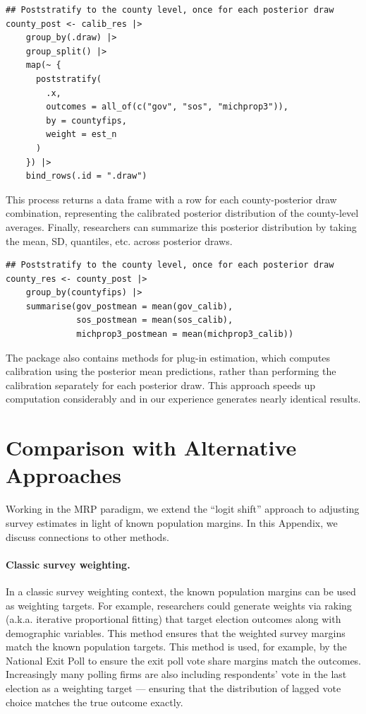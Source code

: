 \begin{small}
\begin{lstlisting}
## Poststratify to the county level, once for each posterior draw
county_post <- calib_res |> 
    group_by(.draw) |>
    group_split() |>
    map(~ {
      poststratify(
        .x, 
        outcomes = all_of(c("gov", "sos", "michprop3")),
        by = countyfips, 
        weight = est_n
      )
    }) |>
    bind_rows(.id = ".draw") 
\end{lstlisting}
\end{small}

This process returns a data frame with a row for each county-posterior draw combination, representing the calibrated posterior distribution of the county-level averages. Finally,  researchers can summarize this posterior distribution by taking the mean, SD, quantiles, etc. across posterior draws.

\begin{small}
\begin{lstlisting}
## Poststratify to the county level, once for each posterior draw
county_res <- county_post |> 
    group_by(countyfips) |>
    summarise(gov_postmean = mean(gov_calib),
              sos_postmean = mean(sos_calib),
              michprop3_postmean = mean(michprop3_calib))
\end{lstlisting}
\end{small}

The package also contains methods for plug-in estimation, which computes calibration using the posterior mean predictions, rather than performing the calibration separately for each posterior draw. This approach speeds up computation considerably and in our experience generates nearly identical results. 


\clearpage

\section{Comparison with Alternative Approaches}
\label{apx:otherwting}

Working in the MRP paradigm, we extend the ``logit shift'' approach to adjusting survey estimates in light of known population margins. 
In this Appendix, we discuss connections to other methods. 


\paragraph{Classic survey weighting.}
In a classic survey weighting context, the known population margins can be used as weighting targets. 
For example, researchers could generate weights via raking (a.k.a. iterative proportional fitting) that target election outcomes along with demographic variables.
This method ensures that the weighted survey margins match the known population targets. 
This method is used, for example, by the National Exit Poll to ensure the exit poll vote share margins match the outcomes. 
Increasingly many polling firms are also including respondents' vote in the last election as a weighting target --- ensuring that the distribution of lagged vote choice matches the true outcome exactly. 


